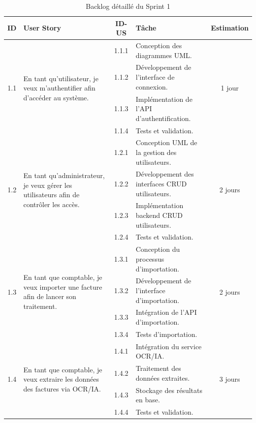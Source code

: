 \begin{table}[H]
	\centering
	\small
	\begin{tabularx}{\textwidth}{|c|p{3.8cm}|c|p{6cm}|c|}
		\hline
		\rowcolor{blue!20}
		\textbf{ID} & \textbf{User Story} & \textbf{ID-US} & \textbf{Tâche} & \textbf{Estimation} \\ \hline
		
		\multirow{4}{*}{1.1}
		& \multirow{4}{3.8cm}{En tant qu’utilisateur, je veux m’authentifier afin d’accéder au système.}
		& 1.1.1 & Conception des diagrammes UML. & \multirow{4}{*}{1 jour} \\ \cline{3-4}
		& & 1.1.2 & Développement de l’interface de connexion. & \\ \cline{3-4}
		& & 1.1.3 & Implémentation de l’API d’authentification. & \\ \cline{3-4}
		& & 1.1.4 & Tests et validation. & \\ \hline
		
		\multirow{4}{*}{1.2}
		& \multirow{4}{3.8cm}{En tant qu’administrateur, je veux gérer les utilisateurs afin de contrôler les accès.}
		& 1.2.1 & Conception UML de la gestion des utilisateurs. & \multirow{4}{*}{2 jours} \\ \cline{3-4}
		& & 1.2.2 & Développement des interfaces CRUD utilisateurs. & \\ \cline{3-4}
		& & 1.2.3 & Implémentation backend CRUD utilisateurs. & \\ \cline{3-4}
		& & 1.2.4 & Tests et validation. & \\ \hline
		
		\multirow{4}{*}{1.3}
		& \multirow{4}{3.8cm}{En tant que comptable, je veux importer une facture afin de lancer son traitement.}
		& 1.3.1 & Conception du processus d’importation. & \multirow{4}{*}{2 jours} \\ \cline{3-4}
		& & 1.3.2 & Développement de l’interface d’importation. & \\ \cline{3-4}
		& & 1.3.3 & Intégration de l’API d’importation. & \\ \cline{3-4}
		& & 1.3.4 & Tests d’importation. & \\ \hline
		
		\multirow{4}{*}{1.4}
		& \multirow{4}{3.8cm}{En tant que comptable, je veux extraire les données des factures via OCR/IA.}
		& 1.4.1 & Intégration du service OCR/IA. & \multirow{4}{*}{3 jours} \\ \cline{3-4}
		& & 1.4.2 & Traitement des données extraites. & \\ \cline{3-4}
		& & 1.4.3 & Stockage des résultats en base. & \\ \cline{3-4}
		& & 1.4.4 & Tests et validation. & \\ \hline
		
	\end{tabularx}
	\caption{Backlog détaillé du Sprint 1}
	\label{tab:backlog_sprint1}
\end{table}

